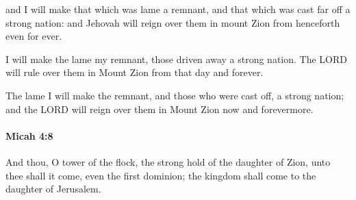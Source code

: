 			\begin{versebox}
					\item[BHS] 
					\item[LXX] 
					\item[ASV] and I will make that which was lame a remnant, and that which was cast far off a strong nation: and Jehovah will reign over them in mount Zion from henceforth even for ever.
					\item[NIV] I will make the lame my remnant, those driven away a strong nation. The LORD will rule over them in Mount Zion from that day and forever.
					\item[NRSV] The lame I will make the remnant, and those who were cast off, a strong nation; and the LORD will reign over them in Mount Zion now and forevermore.
			\end{versebox}

		\paragraph{Micah 4:8} %
			\label{MICAH-4-8}

			And thou, O tower of the flock, the strong hold of the daughter of Zion, unto thee shall it come, even the first dominion; the kingdom shall come to the daughter of Jerusalem.

